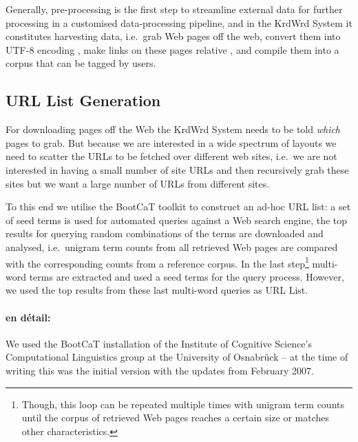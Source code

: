 \begin{longversion}
%
%
Generally, pre-processing is the first step to streamline external data for further processing in a customised data-processing pipeline, and in the KrdWrd System it constitutes harvesting data, i.e.~grab Web pages off the web, convert them into UTF-8 encoding \cite{unicode.org}, make links on these pages relative \cite{w3.org/base}, and compile them into a corpus that can be tagged by users.


\subsection{URL List Generation}

For downloading pages off the Web the KrdWrd System needs to be told \emph{which} pages to grab. But because we are interested in a wide spectrum of layouts we need to scatter the URLs to be fetched over different web sites, i.e.~we are not interested in having a small number of site URLs and then recursively grab these sites but we want a large number of URLs from different sites.

To this end we utilise the BootCaT toolkit\cite{BaroniSilvia2004} to construct an ad-hoc URL list:
a set of seed terms is used for automated queries against a Web search engine, the top results for querying random combinations of the terms are downloaded and analysed, i.e.~unigram term counts from all retrieved Web pages are compared with the corresponding counts from a reference corpus. 
In the last step\footnote{Though, this loop can be repeated multiple times with unigram term counts until the corpus of retrieved Web pages reaches a certain size or matches other characteristics.} multi-word terms are extracted and used a seed terms for the query process.
However, we used the top results from these last multi-word queries as URL List.


\paragraph{en d\'{e}tail:}
We used the BootCaT installation of the Institute of Cognitive Science's Computational Linguistics group at the University of Osnabr\"{u}ck\cite{ikw/CL} -- at the time of writing this was the initial version with the updates from February 2007.


\end{longversion}
